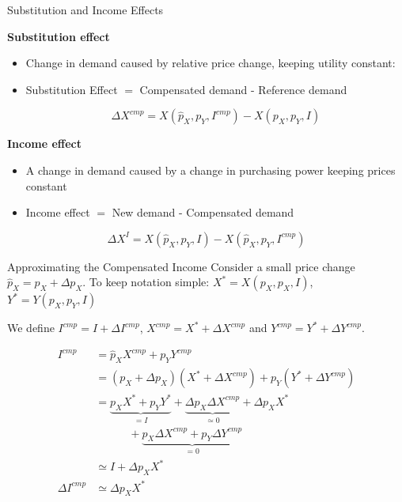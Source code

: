 \documentclass[handout]{beamer}
\newenvironment{iPar}[1]{\textbf{#1} \begin{itemize}}{\end{itemize}}
\newcommand{\cp}{{cmp}}
\begin{document}
\begin{frame}{Substitution and Income Effects}

\begin{iPar}{Substitution effect}
\item  Change in demand caused by relative price change, keeping utility constant:
\item Substitution Effect $=$ Compensated demand - Reference demand

$$ \Delta X^{\cp} =  X(\hat p_X,p_Y,I^\cp) - X(p_X,p_Y,I) $$

\end{iPar}

\begin{iPar}{Income effect}
\item  A change in demand caused by a change in purchasing power keeping prices constant
\item Income effect $=$ New demand - Compensated demand
\end{iPar}
$$ \Delta X^{I} = X(\hat p_X,p_Y,I) - X(\hat p_X,p_Y,I^\cp) $$

\end{frame}

\begin{frame}{Approximating the Compensated Income}
Consider a small price change $\hat p_X = p_X + \Delta p_X$. To keep notation simple: $X^* = X(p_X,p_X,I)$, $Y^* = Y(p_X,p_Y,I)$\\ \smallskip

We define $I^\cp  = I + \Delta I^\cp$, $X^\cp = X^* + \Delta X^\cp$ and  $Y^\cp  = Y^* + \Delta Y^\cp$.

\begin{align*}
I^\cp & =  \hat p_X X^\cp +  p_Y Y^\cp\\
 & =  (p_X + \Delta p_X)(X^* + \Delta X^\cp) + p_Y(Y^* + \Delta Y^\cp)\\ 
  &=  \underbrace{p_X X^* + p_YY^*}_{=I} +\underbrace{\Delta p_X \Delta X^\cp}_{\simeq 0} + \Delta p_X X^* \\
  & \quad \quad \quad + \underbrace{ p_X\Delta X^{\cp} + p_Y \Delta Y^{\cp}}_{=0}\\ & \simeq I+  \Delta p_X X^* \\
 \Delta I^\cp  &\simeq \Delta p_X X^*
\end{align*}
\end{frame}
\end{document}
